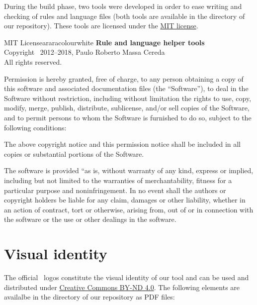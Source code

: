 During the build phase, two tools were developed in order to ease writing and checking of rules and language files (both tools are available in the  directory of our repository). These tools are licensed under the \href{https://opensource.org/licenses/MIT}{MIT license}.

\vspace{1em}

\begin{messagebox}{MIT License}{araracolour}{\icinfo}{white}
\setlength{\parskip}{1em}
\textbf{Rule and language helper tools}\\
Copyright \textcopyright\ 2012--2018, Paulo Roberto Massa Cereda\\
All rights reserved.

Permission is hereby granted, free of charge, to any person obtaining a copy of this software and associated documentation files (the ``Software''), to deal in the Software without restriction, including without limitation the rights to use, copy, modify, merge, publish, distribute, sublicense, and/or sell copies of the Software, and to permit persons to whom the Software is furnished to do so, subject to the following conditions:

The above copyright notice and this permission notice shall be included in all copies or substantial portions of the Software.

The software is provided ``as is, without warranty of any kind, express or implied, including but not limited to the warranties of merchantability, fitness for a particular purpose and noninfringement. In no event shall the authors or copyright holders be liable for any claim, damages or other liability, whether in an action of contract, tort or otherwise, arising from, out of or in connection with the software or the use or other dealings in the software.
\end{messagebox}

\section*{Visual identity}
\label{sec:licensevisualidentity}

The official \arara\ logos constitute the visual identity of our tool and can be used and distributed under \href{https://creativecommons.org/licenses/by-nd/4.0/}{Creative Commons BY-ND 4.0}. The following elements are availalbe in the  directory of our repository as PDF files:

